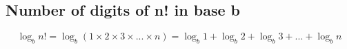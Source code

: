 \subsection{Number of digits of n! in base b}
$$ \log _{b} n! = \log _{b} (1 \times 2 \times 3 \times ... \times n) = \log _{b} 1 + \log _{b} 2 + \log _{b} 3 + ... + \log _{b} n $$